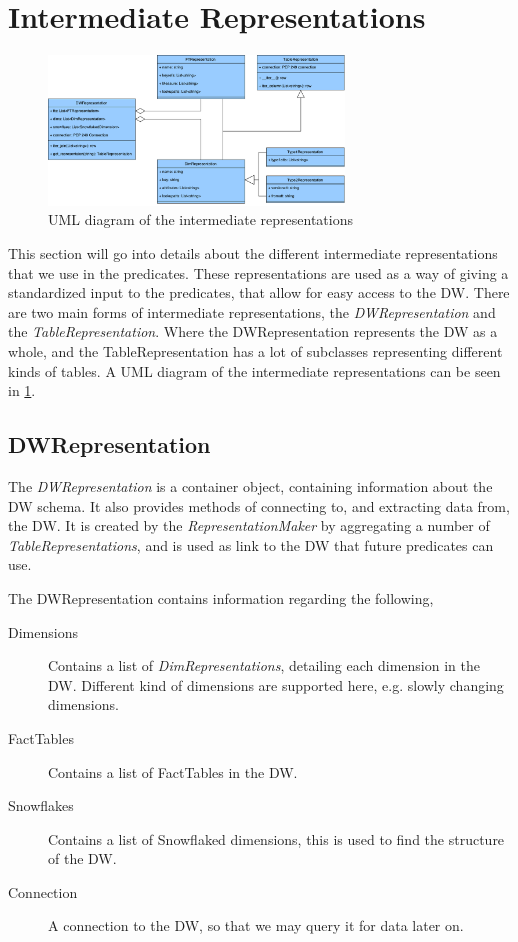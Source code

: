\section{Intermediate Representations}
\begin{figure}
  \centering
  \includegraphics[width=0.7\textwidth]{figures/dwrep_uml.pdf}
  \caption{UML diagram of the intermediate representations}
  \label{fig:dwrep}
\end{figure}

This section will go into details about the different intermediate representations that we use in the predicates. These representations are used as a way of giving a standardized input to the predicates, that allow for easy access to the DW. There are two main forms of intermediate representations, the \textit{DWRepresentation} and the \textit{TableRepresentation}. Where the DWRepresentation represents the DW as a whole, and the TableRepresentation has a lot of subclasses representing different kinds of tables. A UML diagram of the intermediate representations can be seen in \cref{fig:dwrep}.

\subsection{DWRepresentation}
The \textit{DWRepresentation} is a container object, containing information about the DW schema. It also provides methods of connecting to, and extracting data from, the DW. It is created by the \textit{RepresentationMaker} by aggregating a number of \textit{TableRepresentations}, and is used as link to the DW that future predicates can use.

The DWRepresentation contains information regarding the following,

\begin{description}
\item[Dimensions] Contains a list of \textit{DimRepresentations}, detailing each dimension in the DW. Different kind of dimensions are supported here, e.g. slowly changing dimensions.
\item[FactTables] Contains a list of FactTables in the DW.
\item[Snowflakes] Contains a list of Snowflaked dimensions, this is used to find the structure of the DW.
\item[Connection] A connection to the DW, so that we may query it for data later on.
\end{description} 
 

